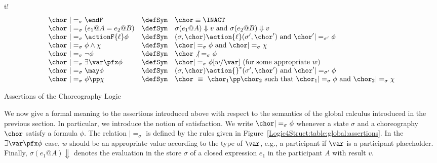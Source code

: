 \begin{myfigure}{t!}
  \centering
  \begin{displaymath}
    \begin{array}{lcl}
      \chor\ |=_\sigma \endF & \defSym & \chor \equiv \INACT 
      \\
      \chor\ |=_\sigma (e_1@A = e_2@B) & \defSym & \sigma(e_1@A)\Downarrow v\text{ and }\sigma(e_2@B)\Downarrow v 
      \\
      \chor\ |=_{\sigma}\actionF{ \ell}\phi&\defSym &  (\sigma,\chor)\action{\ell}(\sigma',\chor')\text{ and }\chor'|=_{\sigma'} \phi
      \\
      \chor\ |=_\sigma \phi\land\chi&\defSym &\chor|=_\sigma \phi \text{ and }\chor|=_\sigma \chi 
      \\
      \chor\ |=_\sigma \neg \phi & \defSym & \chor \not |=_\sigma \phi     
      \\
      \chor\ |=_\sigma \exists\var\pfx\phi & \defSym & \chor |=_\sigma \phi[w/\var]
      \text{ (for some appropriate $w$)}
      \\
      \chor\ |=_\sigma \may \phi & \defSym & (\sigma,\chor) \action{}^*(\sigma',\chor') \text{ and } \chor' |=_{\sigma'} \phi
      \\
      \chor\ |=_\sigma \phi \pp \chi & \defSym & \chor\ \equiv\ \chor_1\pp \chor_2 \text{ such that }
      \chor_1 |=_\sigma\phi \text{ and } \chor_2 |=_\sigma \chi
    \end{array}
  \end{displaymath}
  \caption{Assertions of the Choreography Logic}
  \label{Logic4Struct:table:global:assertions}
\end{myfigure}


We now give a formal meaning to the assertions introduced above with
respect to the semantics of the global calculus introduced in the
previous section. In particular, we introduce the notion of
satisfaction.  We write $\chor |=_\sigma \phi$ whenever a state
$\sigma$ and a choreography $\chor$ satisfy a \GL formula $\phi$.  The
relation $|=_\sigma$ is defined by the rules given in
Figure~\ref{Logic4Struct:table:global:assertions}.  In the
$\exists\var\pfx\phi$ case, $w$ should be an appropriate value
according to the type of $\var$, e.g., a participant if $\var$ is a
participant placeholder. Finally, $\sigma(e_1 @ A) \Downarrow$ denotes
the evaluation in the store $\sigma$ of a closed expression $e_1$ in
the participant $A$ with result $v$.

